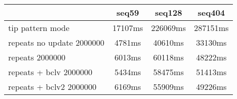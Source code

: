 \begin{tabular}{|l|c|c|c|}
\hline
 & seq59 & seq128 & seq404  \\
\hline
tip pattern mode &  17107ms &  226069ms &  287151ms\\
\hline
repeats no update 2000000 &  4781ms &  40610ms &  33130ms\\
\hline
repeats 2000000 &  6013ms &  60118ms &  48222ms\\
\hline
repeats + bclv 2000000 &  5434ms &  58475ms &  51413ms\\
\hline
repeats + bclv2 2000000 &  6169ms &  55909ms &  49226ms\\
\hline
\end{tabular}
